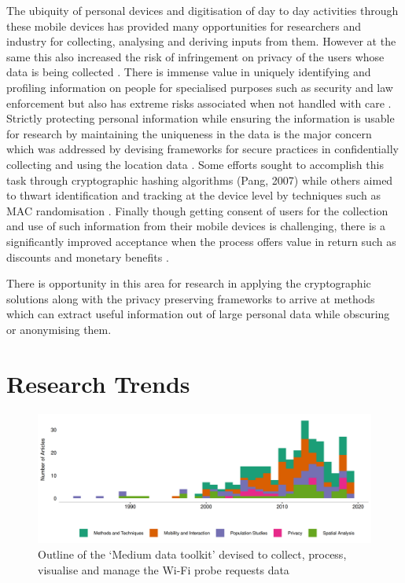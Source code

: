 The ubiquity of personal devices and digitisation of day to day activities through these mobile devices \citep{mcmeel2018} has provided many opportunities for researchers and industry for collecting, analysing and deriving inputs from them.
However at the same this also increased the risk of infringement on privacy of the users whose data is being collected \cite[-2cm]{saponas2007, krumm2009}.
There is immense value in uniquely identifying and profiling information on people for specialised purposes such as security \citep{cutter2006} and law enforcement \citep{dobson2003} but also has extreme risks associated when not handled with care \citep{vanwey2005}.
Strictly protecting personal information while ensuring the information is usable for research by maintaining the uniqueness in the data is the major concern which was addressed by devising frameworks for secure practices in confidentially collecting and using the location data \citep{duckham2006, tang2006, lane2014}.  Some efforts sought to accomplish this task through cryptographic hashing algorithms (Pang, 2007) while others aimed to thwart identification and tracking at the device level by techniques such as MAC randomisation \citep{gruteser2005, greenstein2008}.
Finally though getting consent of users for the collection and use of such information from their mobile devices is challenging, there is a significantly improved acceptance when the process offers value in return such as discounts and monetary benefits \citep{kobsa2014}.

There is opportunity in this area for research in applying the cryptographic solutions along with the privacy preserving frameworks to arrive at methods which can extract useful information out of large personal data while obscuring or anonymising them.

\section{Research Trends}

\begin{figure}
  \includegraphics{images/literature-themes-timeline.png}
  \caption{Outline of the `Medium data toolkit' devised to collect, process, visualise and manage the Wi-Fi probe requests data}
  \label{figure:literature:themes:timeline}
\end{figure}

